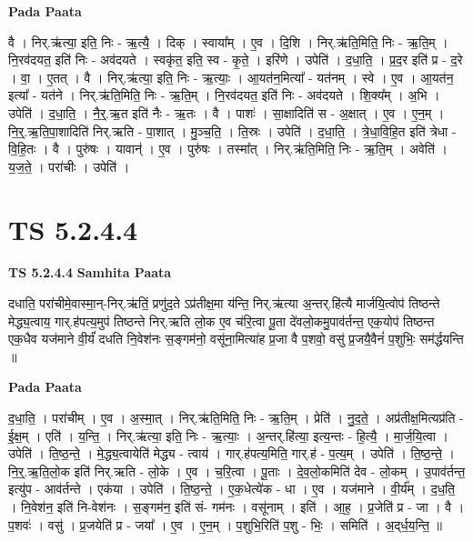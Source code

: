 \documentclass[17pt]{extarticle}
\begin{document}
\textbf{Pada Paata} \newline

वै । निर्.ऋ॑त्या॒ इति॒ निः - ऋ॒त्यै॒ । दिक् । स्वाया᳚म् । ए॒व । दि॒शि । निर्.ऋ॑ति॒मिति॒ निः - ऋ॒ति॒म् । नि॒रव॑दयत॒ इति॑ निः - अव॑दयते । स्वकृ॑त॒ इति॒ स्व - कृ॒ते॒ । इरि॑णे । उपेति॑ । द॒धा॒ति॒ । प्र॒द॒र इति॑ प्र - द॒रे । वा॒ । ए॒तत् । वै । निर्.ऋ॑त्या॒ इति॒ निः - ऋ॒त्याः॒ । आ॒यत॑न॒मित्या᳚ - यत॑नम् । स्वे । ए॒व । आ॒यत॑न॒ इत्या᳚ - यत॑ने । निर्.ऋ॑ति॒मिति॒ निः - ऋ॒ति॒म् । नि॒रव॑दयत॒ इति॑ निः - अव॑दयते । शि॒क्य᳚म् । अ॒भि । उपेति॑ । द॒धा॒ति॒ । नै॒र्॒.ऋ॒त इति॑ नैः - ऋ॒तः । वै । पाशः॑ । सा॒क्षादिति॑ स - अ॒क्षात् । ए॒व । ए॒न॒म् । नि॒र्॒.ऋ॒ति॒पा॒शादिति॑ निर्.ऋति - पा॒शात् । मु॒ञ्च॒ति॒ । ति॒स्रः । उपेति॑ । द॒धा॒ति॒ । त्रे॒धा॒वि॒हि॒त इति॑ त्रेधा - वि॒हि॒तः । वै । पुरु॑षः । यावान्॑ । ए॒व । पुरु॑षः । तस्मा᳚त् । निर्.ऋ॑ति॒मिति॒ निः - ऋ॒ति॒म् । अवेति॑ । य॒ज॒ते॒ । परा॑चीः । उपेति॑ ।  \newline




\section*{ TS 5.2.4.4 }

\textbf{TS 5.2.4.4 } \newline
\textbf{Samhita Paata} \newline

दधाति॒ परा॑चीमे॒वास्मा॒न्-निर्.ऋ॑तिं॒ प्रणु॑द॒ते ऽप्र॑तीक्ष॒मा य॑न्ति॒ निर्.ऋ॑त्या अ॒न्तर्.हि॑त्यै मार्जयि॒त्वोप॑ तिष्ठन्ते मेद्ध्य॒त्वाय॒ गार्.ह॑पत्य॒मुप॑ तिष्ठन्ते निर्.ऋति लो॒क ए॒व च॑रि॒त्वा पू॒ता दे॑वलो॒कमु॒पाव॑र्तन्त॒ एक॒योप॑ तिष्ठन्त एक॒धैव यज॑माने वी॒र्यं॑ दधति नि॒वेश॑नः स॒ङ्गम॑नो॒ वसू॑ना॒मित्या॑ह प्र॒जा वै प॒शवो॒ वसु॑ प्र॒जयै॒वैनं॑ प॒शुभिः॒ सम॑र्द्धयन्ति ॥ \newline

\textbf{Pada Paata} \newline

द॒धा॒ति॒ । परा॑चीम् । ए॒व । अ॒स्मा॒त् । निर्.ऋ॑ति॒मिति॒ निः - ऋ॒ति॒म् । प्रेति॑ । नु॒द॒ते॒ । अप्र॑तीक्ष॒मित्यप्र॑ति - ई॒क्ष॒म् । एति॑ । य॒न्ति॒ । निर्.ऋ॑त्या॒ इति॒ निः - ऋ॒त्याः॒ । अ॒न्तर्.हि॑त्या॒ इत्य॒न्तः - हि॒त्यै॒ । मा॒र्ज॒यि॒त्वा । उपेति॑ । ति॒ष्ठ॒न्ते॒ । मे॒द्ध्य॒त्वायेति॑ मेद्ध्य - त्वाय॑ । गार्.ह॑पत्य॒मिति॒ गार्.ह॑ - प॒त्य॒म् । उपेति॑ । ति॒ष्ठ॒न्ते॒ । नि॒र्॒.ऋ॒ति॒लो॒क इति॑ निर्.ऋति - लो॒के । ए॒व । च॒रि॒त्वा । पू॒ताः । दे॒व॒लो॒कमिति॑ देव -  लो॒कम् । उ॒पाव॑र्तन्त॒ इत्यु॑प - आव॑र्तन्ते । एक॑या । उपेति॑ । ति॒ष्ठ॒न्ते॒ । ए॒क॒धेत्ये॑क - धा । ए॒व । यज॑माने । वी॒र्य᳚म् । द॒ध॒ति॒ । नि॒वेश॑न॒ इति॑ नि-वेश॑नः । स॒ङ्गम॑न॒ इति॑ सं- गम॑नः । वसू॑नाम् । इति॑ । आ॒ह॒ । प्र॒जेति॑ प्र - जा । वै ।   प॒शवः॑ । वसु॑ । प्र॒जयेति॑ प्र - जया᳚ । ए॒व । ए॒न॒म् । प॒शुभि॒रिति॑ प॒शु - भिः॒ । समिति॑ । अ॒द्‌र्ध॒य॒न्ति॒ ॥  \newline
\end{document}
